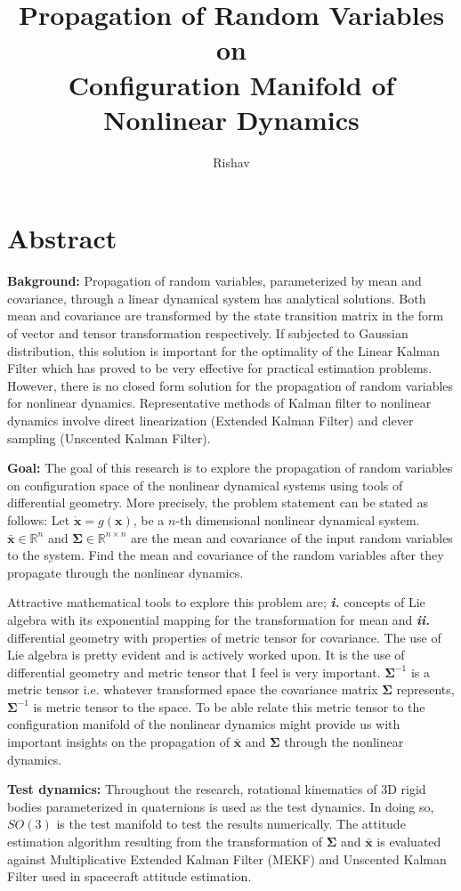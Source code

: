 \documentclass[12pt]{article}
\title{Propagation of Random Variables on \\Configuration Manifold of \\Nonlinear Dynamics}
\author{Rishav}
\begin{document}
\maketitle

\section*{Abstract}
\textbf{Bakground: } Propagation of random variables, parameterized by mean and covariance, through a linear dynamical system has analytical solutions. Both mean and covariance are transformed by the state transition matrix in the form of vector and tensor transformation respectively. If subjected to Gaussian distribution, this solution is important for the optimality of the Linear Kalman Filter which has proved to be very effective for practical estimation problems. However, there is no closed form solution for the propagation of random variables for nonlinear dynamics. Representative methods of Kalman filter to nonlinear dynamics involve direct linearization (Extended Kalman Filter) and clever sampling (Unscented Kalman Filter).

\noindent 
\textbf{Goal: } The goal of this research is to explore the propagation of random variables on configuration space of the nonlinear dynamical systems using tools of differential geometry. More precisely, the problem statement can be stated as follows: Let $\dot{\bm{x}} = g(\bm{x})$, be a $n$-th dimensional nonlinear dynamical system. $\bar{\bm{x}}\in\mathbb{R}^{n}$ and $\bm{\Sigma}\in\mathbb{R}^{n\times n}$ are the mean and covariance of the input random variables to the system. Find the mean and covariance of the random variables after they propagate through the nonlinear dynamics. \medskip

Attractive mathematical tools to explore this problem are; \textbf{\textit{i.}} concepts of Lie algebra with its exponential mapping for the transformation for mean and \textbf{\textit{ii.}} differential geometry with properties of metric tensor for covariance. The use of Lie algebra is pretty evident and is actively worked upon. It is the use of differential geometry and metric tensor that I feel is very important. $\bm{\Sigma}^{-1}$ is a metric tensor i.e. whatever transformed space the covariance matrix $\bm{\Sigma}$ represents, $\bm{\Sigma}^{-1}$ is metric tensor to the space. To be able relate this metric tensor to the configuration manifold of the nonlinear dynamics might provide us with important insights on the propagation of $\bar{\bm{x}}$ and $\bm{\Sigma}$ through the nonlinear dynamics. \medskip

\noindent 
\textbf{Test dynamics: } Throughout the research, rotational kinematics of 3D rigid bodies parameterized in quaternions is used as the test dynamics. In doing so, $SO(3)$ is the test manifold to test the results numerically. The attitude estimation algorithm resulting from the transformation of $\bm{\Sigma}$ and $\bar{\bm{x}}$ is evaluated against Multiplicative Extended Kalman Filter (MEKF) and Unscented Kalman Filter used in spacecraft attitude estimation. 
\end{document}
